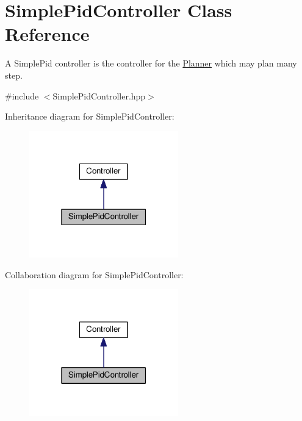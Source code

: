 \hypertarget{classSimplePidController}{}\section{Simple\+Pid\+Controller Class Reference}
\label{classSimplePidController}


A Simple\+Pid controller is the controller for the \hyperlink{classPlanner}{Planner} which may plan many step.  




{\ttfamily \#include $<$Simple\+Pid\+Controller.\+hpp$>$}



Inheritance diagram for Simple\+Pid\+Controller\+:\nopagebreak
\begin{figure}[H]
\begin{center}
\leavevmode
\includegraphics[width=183pt]{classSimplePidController__inherit__graph}
\end{center}
\end{figure}


Collaboration diagram for Simple\+Pid\+Controller\+:\nopagebreak
\begin{figure}[H]
\begin{center}
\leavevmode
\includegraphics[width=183pt]{classSimplePidController__coll__graph}
\end{center}
\end{figure}
